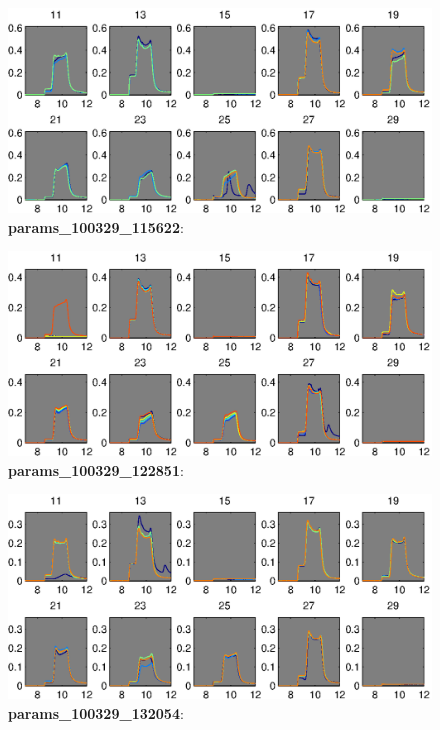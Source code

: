 \documentclass[a4paper]{report}
\begin{document}
\begin{figure}
\centering
\includegraphics[width=5in]{params_100329_115622.eps}
\caption{\textbf{params\_100329\_115622}:}
\end{figure}


\begin{figure}
\centering
\includegraphics[width=5in]{params_100329_122851.eps}
\caption{\textbf{params\_100329\_122851}:}
\end{figure}


\begin{figure}
\centering
\includegraphics[width=5in]{params_100329_132054.eps}
\caption{\textbf{params\_100329\_132054}:}
\end{figure}
\end{document}
